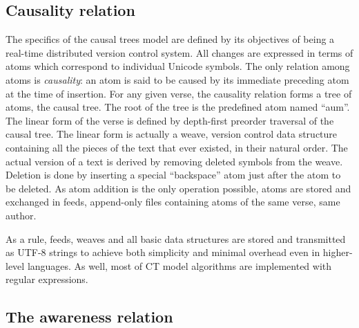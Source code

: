 \documentclass[twocolumn]{article}
\begin{document}
\subsection{Causality relation}   
   
   The specifics of the causal trees model are defined by its
   objectives of being a real-time distributed version control system.
   All changes are expressed in terms of atoms which correspond to
   individual Unicode symbols. The only relation among atoms is
   \emph{causality}: an atom is said to be caused by its immediate preceding
   atom at the time of insertion. For any given verse, the causality
   relation forms a tree of atoms, the causal tree.
   The root of the tree is the predefined atom named ``aum''.
   The linear form of the verse is defined by depth-first preorder
   traversal of the causal tree. The linear form is actually a weave,
   version control data structure containing all the pieces of the
   text that ever existed, in their natural order. The actual version
   of a text is derived by removing deleted symbols from the weave.
   Deletion is done by inserting a special ``backspace'' atom just
   after the atom to be deleted. 
   As atom addition is
   the only operation possible, atoms are stored and exchanged in
   feeds, append-only files containing atoms of the same verse, same
   author.
   
   As a rule, feeds, weaves and all basic data structures are stored
   and transmitted as UTF-8 strings to achieve both simplicity and
   minimal overhead even in higher-level languages. As well, most of
   CT model algorithms are implemented with regular expressions.

\subsection {The awareness relation}
\end{document}
